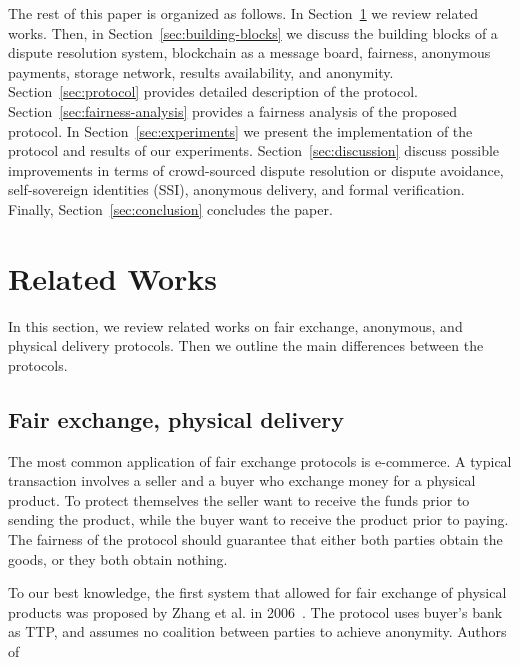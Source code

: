 The rest of this paper is organized as follows.
In Section~\ref{sec:related-works} we review related works. 
Then, in Section~\ref{sec:building-blocks} we discuss the building blocks of a dispute resolution system, blockchain as a message board, fairness, anonymous payments, storage network, results availability, and anonymity.
Section~\ref{sec:protocol} provides detailed description of the protocol.
Section~\ref{sec:fairness-analysis} provides a fairness analysis of the proposed protocol.
In Section~\ref{sec:experiments} we present the implementation of the protocol and results of our experiments.
Section~\ref{sec:discussion} discuss possible improvements in terms of crowd-sourced dispute resolution or dispute avoidance, self-sovereign identities (SSI), anonymous delivery, and formal verification.
Finally, Section~\ref{sec:conclusion} concludes the paper.


\section{Related Works}\label{sec:related-works}
In this section, we review related works on fair exchange, anonymous, and physical delivery protocols. Then we outline the main differences between the protocols.

\subsection{Fair exchange, physical delivery}
The most common application of fair exchange protocols is e-commerce. A typical transaction involves a seller and a buyer who exchange money for a physical product. To protect themselves the seller want to receive the funds prior to sending the product, while the buyer want to receive the product prior to paying. The fairness of the protocol should guarantee that either both parties obtain the goods, or they both obtain nothing.

To our best knowledge, the first system that allowed for fair exchange of physical products was proposed by Zhang et al. in 2006~\cite{zhangPracticalFairExchangeEPayment2006}. The protocol uses buyer's bank as TTP, and assumes no coalition between parties to achieve anonymity. 
Authors of

